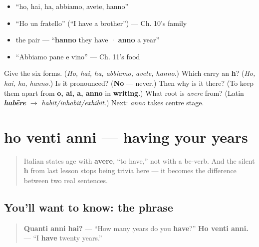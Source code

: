\begin{itemize}
\raggedright
  \item \textquotedblleft{}ho, hai, ha, abbiamo, avete, hanno\textquotedblright{}
  \item \textquotedblleft{}Ho un fratello\textquotedblright{} (\textquotedblleft{}I have a brother\textquotedblright{}) — Ch. 10's family
  \item the pair — \textquotedblleft{}\textbf{hanno} they have · \textbf{anno} a year\textquotedblright{}
  \item \textquotedblleft{}Abbiamo pane e vino\textquotedblright{} — Ch. 11's food
\end{itemize}

\begin{tcolorbox}[breakable,colback=teal!4,colframe=teal!35!black,title={Before you move on}]
Give the six forms. (\emph{Ho, hai, ha, abbiamo, avete, hanno}.) Which carry an \textbf{h}? (\emph{Ho, hai, ha, hanno}.) Is it pronounced? (\textbf{No} — never.) Then why is it there? (To keep them apart from \textbf{o, ai, a, anno} in \textbf{writing}.) What root is \emph{avere} from? (Latin \emph{\textbf{habēre}} $\to$ \emph{habit/inhabit/exhibit}.) Next: \emph{anno} takes centre stage.
\end{tcolorbox}
\section[ho venti anni]{ho venti anni — having your years}

\label{lesson:IT-C14-eta}



\begin{quote}
Italian states age with \textbf{avere}, \textquotedblleft{}to have,\textquotedblright{} not with a be-verb. And the silent \textbf{h} from last lesson stops being trivia here — it becomes the difference between two real sentences.
\end{quote}

\subsection*{You'll want to know: the phrase}
\begin{quote}
\textbf{Quanti anni hai?} — \textquotedblleft{}How many years do you \textbf{have}?\textquotedblright{} \textbf{Ho venti anni.} — \textquotedblleft{}I \textbf{have} twenty years.\textquotedblright{}
\end{quote}

